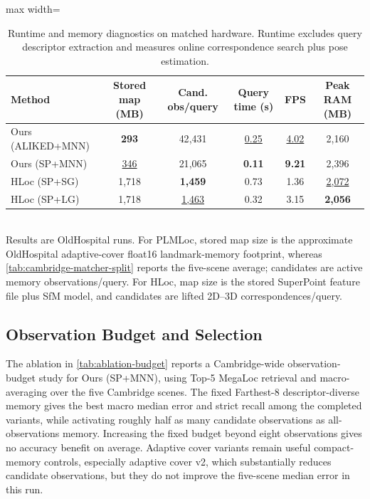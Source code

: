 \documentclass[letterpaper,10 pt,conference]{ieeeconf}
\newcommand{\method}{PLMLoc}
\begin{document}
\begin{table}[!t]
    \centering
    \caption{Runtime and memory diagnostics on matched hardware. Runtime excludes query descriptor extraction and measures online correspondence search plus pose estimation.}
    \label{tab:runtime}
    \setlength{\tabcolsep}{5pt}
    \begin{adjustbox}{max width=\textwidth}
    \begin{tabular}{@{}lccccc@{}}
        \toprule
        Method & Stored map (MB) & Cand. obs/query & Query time (s) & FPS & Peak RAM (MB) \\
        \midrule
        Ours (ALIKED+MNN) & \textbf{293} & 42{,}431 & \underline{0.25} & \underline{4.02} & 2{,}160 \\
        Ours (SP+MNN) & \underline{346} & 21{,}065 & \textbf{0.11} & \textbf{9.21} & 2{,}396 \\
        HLoc (SP+SG)~\cite{sarlin2019hloc,sarlin2020superglue} & 1{,}718 & \textbf{1{,}459} & 0.73 & 1.36 & \underline{2{,}072} \\
        HLoc (SP+LG)~\cite{sarlin2019hloc,lindenberger2023lightglue} & 1{,}718 & \underline{1{,}463} & 0.32 & 3.15 & \textbf{2{,}056} \\
        \bottomrule
    \end{tabular}
    \end{adjustbox}
    \\[2pt]
    {Results are OldHospital runs. For \method{}, stored map size is the approximate OldHospital adaptive-cover float16 landmark-memory footprint, whereas \cref{tab:cambridge-matcher-split} reports the five-scene average; candidates are active memory observations/query. For HLoc, map size is the stored SuperPoint feature file plus SfM model, and candidates are lifted 2D--3D correspondences/query.}
\end{table}

\subsection{Observation Budget and Selection}

The ablation in \cref{tab:ablation-budget} reports a Cambridge-wide observation-budget study for Ours (SP+MNN), using Top-5 MegaLoc retrieval and macro-averaging over the five Cambridge scenes. The fixed Farthest-8 descriptor-diverse memory gives the best macro median error and strict recall among the completed variants, while activating roughly half as many candidate observations as all-observations memory. Increasing the fixed budget beyond eight observations gives no accuracy benefit on average. Adaptive cover variants remain useful compact-memory controls, especially adaptive cover v2, which substantially reduces candidate observations, but they do not improve the five-scene median error in this run.
\end{document}
